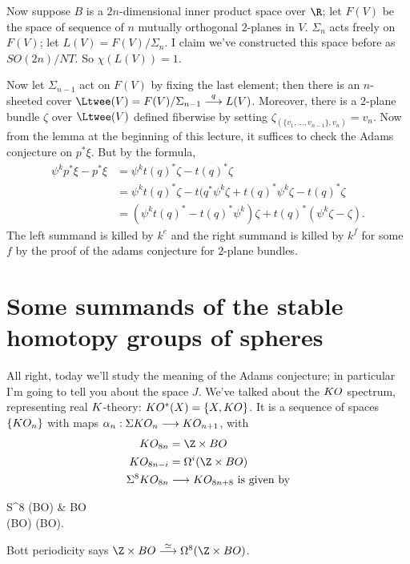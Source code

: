 Now suppose $B$ is a $2n$-dimensional inner product space over $\R$; let $F(V)$ be the space of sequence of $n$ mutually orthogonal $2$-planes in $V$.  $\Sigma_n$ acts freely on $F(V)$; let $L(V) = F(V) / \Sigma_n$.  I claim we've constructed this space before as $SO(2n)/NT$.  So $\chi(L(V)) = 1$.

Now let $\Sigma_{n-1}$ act on $F(V)$ by fixing the last element; then there is an $n$-sheeted cover $\Ltwee(V) = F(V)/\Sigma_{n-1} \stackrel{q}{\to} L(V)$.  Moreover, there is a $2$-plane bundle $\zeta$ over $\Ltwee(V)$ defined fiberwise by setting $\zeta_{(\{v_1, \ldots, v_{n-1}\}, v_n)} = v_n$.  Now from the lemma at the beginning of this lecture, it suffices to check the Adams conjecture on $p^* \xi$.  But by the formula,
\begin{align*}
\psi^k p^* \xi - p^* \xi & = \psi^k t(q)^* \zeta - t(q)^* \zeta \\
& = \psi^k t(q)^* \zeta - t(q^* \psi^k \zeta + t(q)^* \psi^k \zeta - t(q)^* \zeta \\
& = (\psi^k t(q)^* - t(q)^* \psi^k) \zeta + t(q)^*(\psi^k \zeta - \zeta).
\end{align*}
The left summand is killed by $k^e$ and the right summand is killed by $k^f$ for some $f$ by the proof of the adams conjecture for $2$-plane bundles.

\fi
\BoxedNote{}

\section{Some summands of the stable homotopy groups of spheres} %
\label{SomeSummandsOfStableHomotopyOfSpheres}
\ifx\OutputSomeSummandsOfStableHomotopyOfSpheres\undefined\else
All right, today we'll study the meaning of the Adams conjecture; in particular I'm going to tell you about the space $J$.  We've talked about the $KO$ spectrum, representing real $K$-theory: $KO^*(X) = \{X, KO\}$.  It is a sequence of spaces $\{KO_n\}$ with maps $\alpha_n: \Sigma KO_n \longrightarrow KO_{n+1}$, with
\begin{align*}
\KO_{8n} & = \Z \times BO \\
\KO_{8n-i} & = \Loops^i (\Z \times BO) \\
\Suspend^8 \KO_{8n} & \to \KO_{8n+8} \hbox{ is given by}
\end{align*}
\begin{ctikzcd}
S^8 \sprod (\Z \times BO) \dar\rar & \Z \times BO \\
(\Z \times BO) \sprod (\Z \times BO)\urar["\mu"].
\end{ctikzcd}
Bott periodicity says $\Z \times BO \stackrel{\simeq}{\to} \Loops^8(\Z \times BO)$.

